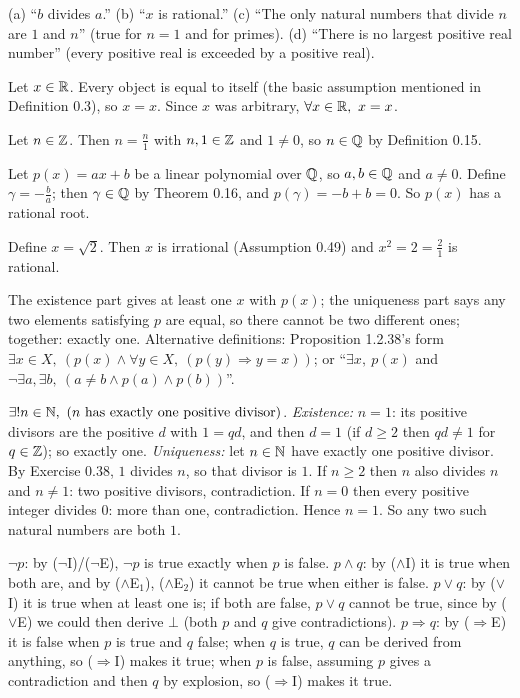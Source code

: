  (a) ``$b$ divides $a$.'' (b) ``$x$ is rational.'' (c) ``The only natural numbers that divide $n$ are $1$ and $n$'' (true for $n=1$ and for primes). (d) ``There is no largest positive real number'' (every positive real is exceeded by a positive real).

 Let $x\in\mathbb{R}$. Every object is equal to itself (the basic assumption mentioned in Definition 0.3), so $x=x$. Since $x$ was arbitrary, $\forall x\in\R,\ x=x$.

 Let $n\in\mathbb{Z}$. Then $n=\frac n1$ with $n,1\in\mathbb{Z}$ and $1\ne0$, so $n\in\mathbb{Q}$ by Definition 0.15.

 Let $p(x)=ax+b$ be a linear polynomial over $\mathbb{Q}$, so $a,b\in\mathbb{Q}$ and $a\ne0$. Define $\gamma=-\frac ba$; then $\gamma\in\mathbb{Q}$ by Theorem 0.16, and $p(\gamma)=-b+b=0$. So $p(x)$ has a rational root.

 Define $x=\sqrt2$. Then $x$ is irrational (Assumption 0.49) and $x^2=2=\frac21$ is rational.

 The existence part gives at least one $x$ with $p(x)$; the uniqueness part says any two elements satisfying $p$ are equal, so there cannot be two different ones; together: exactly one. Alternative definitions: Proposition 1.2.38's form $\exists x\in X,\ (p(x)\wedge\forall y\in X,\ (p(y)\Rightarrow y=x))$; or ``$\exists x,\ p(x)$ and $\neg\exists a,\exists b,\ (a\ne b\wedge p(a)\wedge p(b))$''.

 $\exists!n\in\mathbb{N},\ (n\text{ has exactly one positive divisor})$. \emph{Existence:} $n=1$: its positive divisors are the positive $d$ with $1=qd$, and then $d=1$ (if $d\ge2$ then $qd\ne1$ for $q\in\mathbb{Z}$); so exactly one. \emph{Uniqueness:} let $n\in\mathbb{N}$ have exactly one positive divisor. By Exercise 0.38, $1$ divides $n$, so that divisor is $1$. If $n\ge2$ then $n$ also divides $n$ and $n\ne1$: two positive divisors, contradiction. If $n=0$ then every positive integer divides $0$: more than one, contradiction. Hence $n=1$. So any two such natural numbers are both $1$.

 $\neg p$: by ($\neg$I)/($\neg$E), $\neg p$ is true exactly when $p$ is false. $p\wedge q$: by ($\wedge$I) it is true when both are, and by ($\wedge$E$_1$), ($\wedge$E$_2$) it cannot be true when either is false. $p\vee q$: by ($\vee$I) it is true when at least one is; if both are false, $p\vee q$ cannot be true, since by ($\vee$E) we could then derive $\bot$ (both $p$ and $q$ give contradictions). $p\Rightarrow q$: by ($\Rightarrow$E) it is false when $p$ is true and $q$ false; when $q$ is true, $q$ can be derived from anything, so ($\Rightarrow$I) makes it true; when $p$ is false, assuming $p$ gives a contradiction and then $q$ by explosion, so ($\Rightarrow$I) makes it true.

